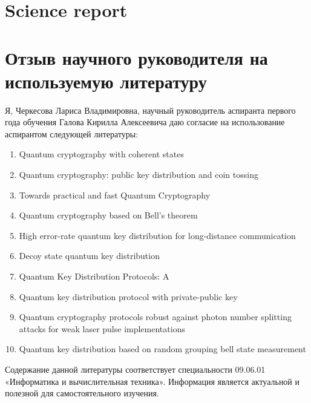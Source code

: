 \section{Science report}
\blindtext
\clearpage

\section*{Отзыв научного руководителя на используемую литературу}
Я, Черкесова Лариса Владимировна, научный руководитель аспиранта первого года обучения Галова Кирилла Алексеевича даю согласие на использование аспирантом следующей литературы:
\begin{enumerate}
	\item Quantum cryptography with coherent states
	\item Quantum cryptography: public key distribution and coin tossing
	\item Towards practical and fast Quantum Cryptography
	\item Quantum cryptography based on Bell's theorem
	\item High error-rate quantum key distribution for long-distance communication
	\item Decoy state quantum key distribution
	\item Quantum Key Distribution Protocols: A \review
	\item Quantum key distribution protocol with private-public key
	\item Quantum cryptography protocols robust against photon number splitting attacks for weak laser pulse implementations
	\item Quantum key distribution based on random grouping bell state measurement
\end{enumerate}
Содержание данной литературы соответствует специальности 09.06.01 «Информатика и вычислительная техника». Информация является актуальной и полезной для самостоятельного изучения.\\
\bigskip





